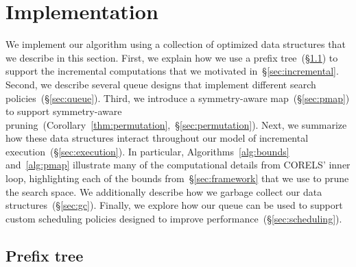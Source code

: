

\clearpage
\section{Implementation}
\label{sec:implementation}

We implement our algorithm using a collection of optimized data structures
that we describe in this section.
%
First, we explain how we use a prefix tree~(\S\ref{sec:trie})
to support the incremental computations that we motivated in~\S\ref{sec:incremental}.
%
Second, we describe several queue designs
that implement different search policies~(\S\ref{sec:queue}).
%
Third, we introduce a symmetry-aware map~(\S\ref{sec:pmap}) to support
symmetry-aware pruning~(Corollary~\ref{thm:permutation},~\S\ref{sec:permutation}).
%
Next, we summarize how these data structures interact throughout
our model of incremental execution~(\S\ref{sec:execution}).
%
In particular, Algorithms~\ref{alg:bounds} and~\ref{alg:pmap} illustrate many
of the computational details from CORELS' inner loop, highlighting each of
the bounds from~\S\ref{sec:framework} that we use to prune the search space.
%
We additionally describe how we garbage collect our data structures~(\S\ref{sec:gc}).
%
Finally, we explore how our queue can be used to support
custom scheduling policies designed to improve performance~(\S\ref{sec:scheduling}).

\subsection{Prefix tree}
\label{sec:trie}


